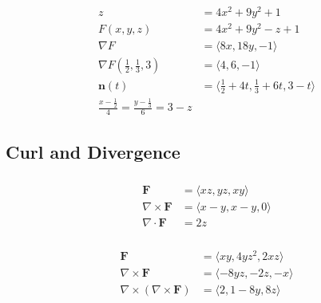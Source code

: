 \documentclass{article}
\begin{document}
\setcounter{subsubsection}{34}
\subsubsection{}

\begin{align*}
  z                                                   & = 4 x^2 + 9 y^2 + 1                                           \\
  F(x, y, z)                                          & = 4 x^2 + 9 y^2 - z + 1                                       \\
  \nabla F                                            & = \langle 8 x, 18 y, -1 \rangle                               \\
  \nabla F \left( \frac{1}{2}, \frac{1}{3}, 3 \right) & = \langle 4, 6, -1 \rangle                                    \\
  \mathbf{n}(t)                                       & = \langle \frac{1}{2} + 4 t, \frac{1}{3} + 6 t, 3 - t \rangle \\
  \frac{x - \frac{1}{2}}{4} = \frac{y - \frac{1}{3}}{6} = 3 - z
\end{align*}

\subsection{Curl and Divergence}

\setcounter{subsubsection}{6}
\subsubsection{}

\begin{align*}
  \mathbf{F}               & = \langle x z, y z, x y \rangle   \\
  \nabla \times \mathbf{F} & = \langle x - y, x - y, 0 \rangle \\
  \nabla \cdot \mathbf{F}  & = 2 z
\end{align*}

\setcounter{subsubsection}{34}
\subsubsection{}

\begin{align*}
  \mathbf{F}                               & = \langle x y, 4 y z^2, 2 x z \rangle \\
  \nabla \times \mathbf{F}                 & = \langle -8 y z, -2 z, -x \rangle    \\
  \nabla \times (\nabla \times \mathbf{F}) & = \langle 2, 1 - 8 y, 8 z \rangle
\end{align*}
\end{document}
